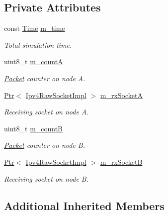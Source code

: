 \subsection*{Private Attributes}
\begin{DoxyCompactItemize}
\item 
const \hyperlink{classns3_1_1Time}{Time} \hyperlink{classns3_1_1olsr_1_1HelloRegressionTest_a3f8d630c066f0cb7fc33cd7174d05594}{m\+\_\+time}
\begin{DoxyCompactList}\small\item\em Total simulation time. \end{DoxyCompactList}\item 
uint8\+\_\+t \hyperlink{classns3_1_1olsr_1_1HelloRegressionTest_a89b07fe86d41662bf3ef877f244d333c}{m\+\_\+countA}
\begin{DoxyCompactList}\small\item\em \hyperlink{classns3_1_1Packet}{Packet} counter on node A. \end{DoxyCompactList}\item 
\hyperlink{classns3_1_1Ptr}{Ptr}$<$ \hyperlink{classns3_1_1Ipv4RawSocketImpl}{Ipv4\+Raw\+Socket\+Impl} $>$ \hyperlink{classns3_1_1olsr_1_1HelloRegressionTest_a09824a508053ac7482c72babc4976558}{m\+\_\+rx\+SocketA}
\begin{DoxyCompactList}\small\item\em Receiving socket on node A. \end{DoxyCompactList}\item 
uint8\+\_\+t \hyperlink{classns3_1_1olsr_1_1HelloRegressionTest_aa3b0da1aed971f58de9e95663bd0b8e0}{m\+\_\+countB}
\begin{DoxyCompactList}\small\item\em \hyperlink{classns3_1_1Packet}{Packet} counter on node B. \end{DoxyCompactList}\item 
\hyperlink{classns3_1_1Ptr}{Ptr}$<$ \hyperlink{classns3_1_1Ipv4RawSocketImpl}{Ipv4\+Raw\+Socket\+Impl} $>$ \hyperlink{classns3_1_1olsr_1_1HelloRegressionTest_a36afc1d537401f41ec4a5d899584cdcb}{m\+\_\+rx\+SocketB}
\begin{DoxyCompactList}\small\item\em Receiving socket on node B. \end{DoxyCompactList}\end{DoxyCompactItemize}
\subsection*{Additional Inherited Members}


